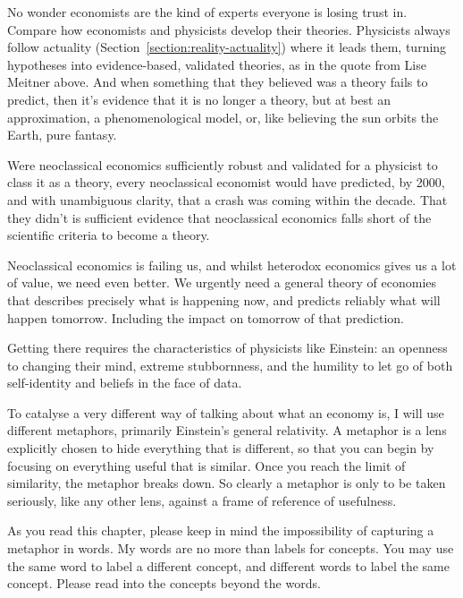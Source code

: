 No wonder economists  are the kind of experts everyone is losing trust in\cite{wolf-economists-failed-experts}. Compare how economists\cite{keen-debunking} and physicists develop their theories. Physicists always follow actuality (Section~\ref{section:reality-actuality}) where it leads them, turning hypotheses into evidence-based, validated theories, as in the quote from Lise Meitner above. And when something that they believed was a theory fails to predict, then it's evidence that it is no longer a theory, but at best an approximation, a phenomenological model, or, like believing the sun orbits the Earth, pure fantasy. 


Were neoclassical economics sufficiently robust and validated for a physicist to class it as a theory, every neoclassical economist would have predicted, by 2000, and with unambiguous clarity, that a crash was coming within the decade. That they didn’t is sufficient evidence that neoclassical economics falls short of the scientific criteria to become a theory.


Neoclassical economics is failing us, and whilst heterodox economics gives us a lot of value, we need even better. We urgently need a general theory of economies that describes precisely what is happening now, and predicts reliably what will happen tomorrow. Including the impact on tomorrow of that prediction.


Getting there requires the characteristics of physicists like Einstein:  an openness to changing their mind, extreme stubbornness, and the humility to let go of both self-identity and beliefs in the face of data.


To catalyse a very different way of talking about what an economy is, I will use different metaphors, primarily Einstein's general relativity. A metaphor  is a lens  explicitly chosen to hide everything that is different, so that you can begin by focusing on everything useful that is similar. Once you reach the limit of similarity, the metaphor breaks down. So clearly a metaphor is only to be taken seriously, like any other lens, against a frame of reference  of usefulness. 


As you read this chapter, please keep in mind the impossibility of capturing a metaphor in words. My words are no more than labels for concepts. You may use the same word to label a different concept, and different words to label the same concept. Please read into the concepts beyond the words.


